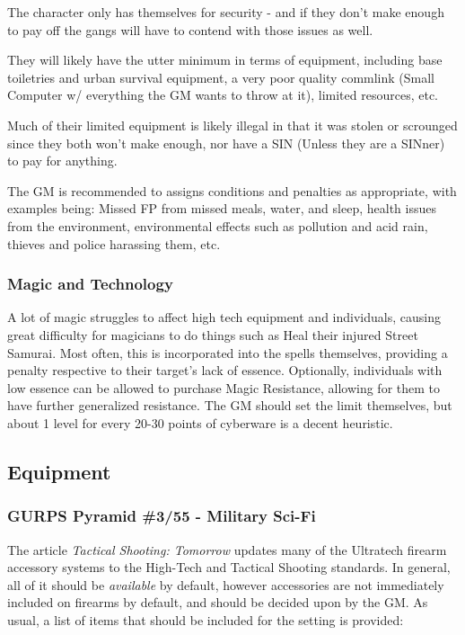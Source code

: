 \begin{multicols}{2}
\begin{coloredbox}
	The character only has themselves for security - and if they don't make enough to pay off the gangs will have to contend with those issues as well. 
	
	They will likely have the utter minimum in terms of equipment, including base toiletries and urban survival equipment, a very poor quality commlink (Small Computer w/ everything the GM wants to throw at it), limited resources, etc. 
	
	Much of their limited equipment is likely illegal in that it was stolen or scrounged since they both won't make enough, nor have a SIN (Unless they are a SINner) to pay for anything.
	
	The GM is recommended to assigns conditions and penalties as appropriate, with examples being: Missed FP from missed meals, water, and sleep, health issues from the environment, environmental effects such as pollution and acid rain, thieves and police harassing them, etc. \\
	
\end{coloredbox}
	
	\subsubsection{Magic and Technology}
	
	A lot of magic struggles to affect high tech equipment and individuals, causing great difficulty for magicians to do things such as Heal their injured Street Samurai. Most often, this is incorporated into the spells themselves, providing a penalty respective to their target's lack of essence. Optionally, individuals with low essence can be allowed to purchase Magic Resistance, allowing for them to have further generalized resistance. The GM should set the limit themselves, but about 1 level for every 20-30 points of cyberware is a decent heuristic.
	
	\subsection{Equipment}\label{setting_equipment}
	
	\subsubsection{GURPS Pyramid \#3/55 - Military Sci-Fi}\label{3/55}
	
	The article \textit{Tactical Shooting: Tomorrow} updates many of the Ultratech firearm accessory systems to the High-Tech and Tactical Shooting standards. In general, all of it should be \textit{available} by default, however accessories are not immediately included on firearms by default, and should be decided upon by the GM. As usual, a list of items that should be included for the setting is provided:
	

\end{multicols}
